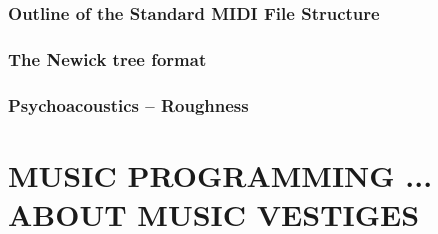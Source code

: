 \documentclass{book}
\begin{document}
\section{Outline of the Standard MIDI File Structure}
\label{infomidi}


\newpage
\section{The Newick tree format}
\label{nwdoc}


\newpage
\section{Psychoacoustics -- Roughness}
\label{rugdoc}



\part[Music Programming ... about music vestiges]{MUSIC PROGRAMMING ... ABOUT MUSIC VESTIGES}

\thispagestyle{empty}



\thispagestyle{empty}




\end{document}
